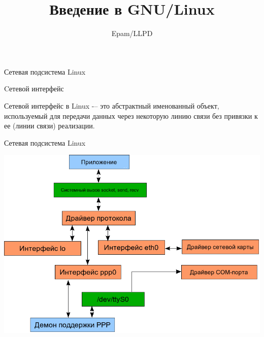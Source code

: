 \documentclass[ignorenonframetext, professionalfonts, hyperref={pdftex, unicode}]{beamer}
\title{Введение в GNU/Linux}
\author{Epam/LLPD}
\begin{document}
\frame{
	\tableofcontents
}

\begin{frame}{Сетевая подсистема Linux}

	\begin{block}{Cетевой интерфейс}

		Сетевой интерфейс в Linux -– это абстрактный именованный объект,  используемый для передачи 
		данных через некоторую линию связи без привязки к ее (линии связи) реализации.
	\end{block}
\end{frame}

\begin{frame}{Сетевая подсистема Linux}

	\center\includegraphics[height=0.8\textheight]{06-netstack.png}

\end{frame}
\end{document}
